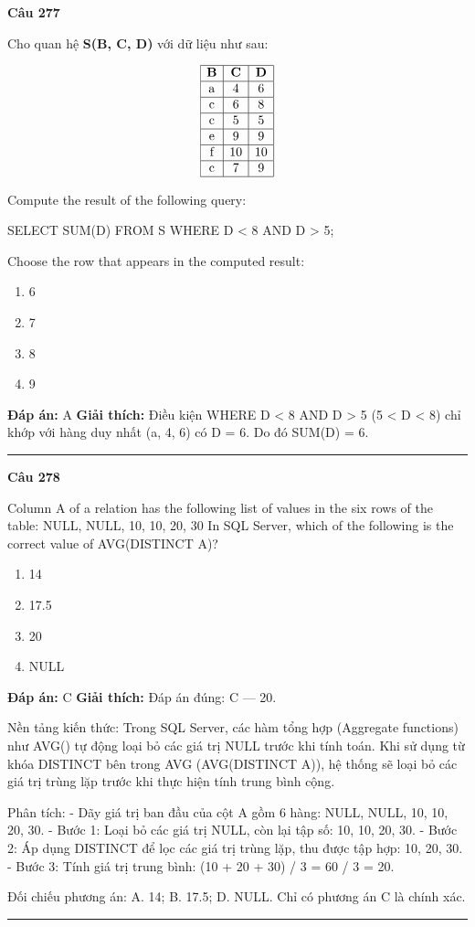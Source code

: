 \documentclass[11pt,a4paper]{article}
\newenvironment{question}[1]{%
  \par\vspace{1em}\noindent\textbf{\large Câu #1}\par\vspace{0.4em}
}{%
  \par\vspace{1em}\hrule\vspace{0.6em}
}
\newenvironment{choices}{%
  \begin{enumerate}[label=\textbf{\Alph*.},leftmargin=2.2em,itemsep=2pt,topsep=3pt]
}{%
  \end{enumerate}
}
\newcommand{\choice}{\item}
\newenvironment{codebox}{%
  \begin{tcolorbox}[colback=gray!8!white,colframe=gray!50!black,arc=1.5mm,boxrule=0.6pt,left=3mm,right=3mm,top=2.5mm,bottom=2.5mm]
  \ttfamily\small
}{%
  \end{tcolorbox}
}
\begin{document}
\begin{question}{277}
Cho quan hệ \textbf{S(B, C, D)} với dữ liệu như sau:

$$\begin{array}{|c|c|c|}
\hline
\textbf{B} & \textbf{C} & \textbf{D} \\
\hline
\text{a} & 4 & 6 \\
\hline
\text{c} & 6 & 8 \\
\hline
\text{c} & 5 & 5 \\
\hline
\text{e} & 9 & 9 \\
\hline
\text{f} & 10 & 10 \\
\hline
\text{c} & 7 & 9 \\
\hline
\end{array}$$

Compute the result of the following query:
\begin{codebox}
SELECT SUM(D)
FROM S
WHERE D < 8 AND D > 5;
\end{codebox}
Choose the row that appears in the computed result:
\begin{choices}
\choice 6
\choice 7
\choice 8
\choice 9
\end{choices}
\textbf{Đáp án:} A
\textbf{Giải thích:} Điều kiện WHERE D < 8 AND D > 5 (5 < D < 8) chỉ khớp với hàng duy nhất (a, 4, 6) có D = 6. Do đó SUM(D) = 6.
\end{question}

\begin{question}{278}
Column A of a relation has the following list of values in the six rows of the table:
NULL, NULL, 10, 10, 20, 30
In SQL Server, which of the following is the correct value of
AVG(DISTINCT A)?
\begin{choices}
\choice 14
\choice 17.5
\choice 20
\choice NULL
\end{choices}
\textbf{Đáp án:} C
\textbf{Giải thích:} Đáp án đúng: C — 20.

Nền tảng kiến thức: Trong SQL Server, các hàm tổng hợp (Aggregate functions) như AVG() tự động loại bỏ các giá trị NULL trước khi tính toán. Khi sử dụng từ khóa DISTINCT bên trong AVG (AVG(DISTINCT A)), hệ thống sẽ loại bỏ các giá trị trùng lặp trước khi thực hiện tính trung bình cộng.

Phân tích:
- Dãy giá trị ban đầu của cột A gồm 6 hàng: NULL, NULL, 10, 10, 20, 30.
- Bước 1: Loại bỏ các giá trị NULL, còn lại tập số: {10, 10, 20, 30}.
- Bước 2: Áp dụng DISTINCT để lọc các giá trị trùng lặp, thu được tập hợp: {10, 20, 30}.
- Bước 3: Tính giá trị trung bình: (10 + 20 + 30) / 3 = 60 / 3 = 20.

Đối chiếu phương án: A. 14; B. 17.5; D. NULL. Chỉ có phương án C là chính xác.
\end{question}
\end{document}
